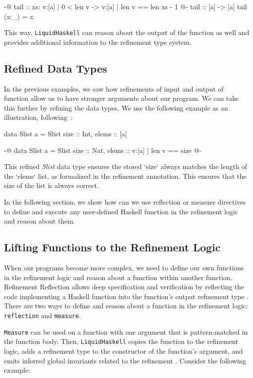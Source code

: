 \documentclass[]{rptuseminar}
\begin{document}
\begin{haskell}
 {-@ tail :: xs: {v:[a] | 0 < len v} -> {v:[a] | len v == len xs - 1} @-}
 tail :: [a] -> [a]
 tail (x:_) = x
\end{haskell}

This way, \texttt{LiquidHaskell} can reason about the output of the 
function as well and provides additional information to the refinement type system.


\subsection{Refined Data Types}
In the previous examples, we saw how refinements of input and output of function allow us to have stronger arguments about our program. 
We can take this further by refining the data types. 
We use the following example as an illustration, following~\cite{jhala_programming_2020}:
\begin{haskell}
  data Slist a = Slist { size :: Int, elems :: [a] }

  {-@ data Slist a = Slist { size :: Nat, elems :: {v:[a] | len v == size} } @-}
\end{haskell}

This refined \textit{Slist} data type ensures the stored `size` always matches the length of the `elems` list, 
as formalized in the refinement annotation. 
This ensures that the size of the list is always correct.

In the following section, we show how can we use reflection or measure directives to define and execute any user-defined Haskell function in the refinement logic and
reason about them.

\subsection{Lifting Functions to the Refinement Logic}
\label{sec:reflection}
When our programs become more complex, we need to define our own functions in the refinement logic and reason about
a function within another function. Refinement Reflection allows deep specification and verification by 
reflecting the code implementing a Haskell function into the function’s output refinement type \cite{niki_blog_2016}.
There are two ways to define and reason about a function in the refinement logic: \texttt{reflection} and \texttt{measure}. 

\texttt{Measure} can be used on a function with one argument that is pattern-matched in the function body. Then,
\texttt{LiquidHaskell} copies the function to the refinement logic, adds a refinement type to the constructor of the function's argument, and emits inferred global
invariants related to the refinement \cite{niki_lecture_2024}. Consider the following example:
\end{document}
